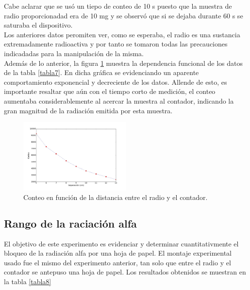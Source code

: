 \documentclass[prb,aps,twocolumn,preprintnumbers,amsmath,amssymb]{revtex4}
\begin{document}
Cabe aclarar que se usó un tiepo de conteo de 10 s puesto que la muestra de radio proporcionadad era de 10 mg y se observó que si se dejaba durante 60 s se saturaba el dispositivo.\\

Los anteriores datos peromiten ver, como se esperaba, el radio es una sustancia extremadamente radioactiva y por tanto se tomaron todas las precauciones indicadadas para la manipulación de la misma.\\

Además de lo anterior, la figura \ref{fig: radio2} muestra la dependencia funcional de los datos de la tabla \ref{tabla7}. En dicha gráfica se evidenciando un aparente comportamiento exponencial  y decreciente de los datos. Allende de esto, es importante resaltar que aún con el tiempo corto de medición, el conteo aumentaba considerablemente al acercar la muestra al contador, indicando la gran magnitud de la radiación emitida por esta muestra.

\begin{figure}[h!]
	\centering
	\includegraphics[width=0.5\textwidth]{radio2}
	\caption{Conteo en función de la distancia entre el radio y el contador.}
	\label{fig: radio2}
\end{figure}

\subsection{Rango de la raciación alfa}

El objetivo de este experimento es evidenciar y determinar cuantitativmente el bloqueo de la radiación alfa por una hoja de papel. El montaje experimental usado fue el mismo del experimento anterior, tan solo que entre el radio y el contador se antepuso una hoja de papel. Los resultados obtenidos se muestran en la tabla \ref{tabla8}
\end{document}
